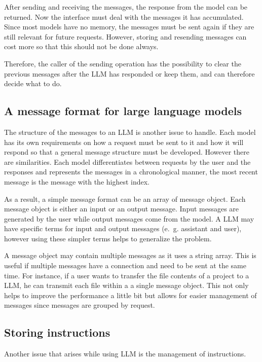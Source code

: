After sending and receiving the messages, the response from the model can be returned. Now the interface must deal with the messages it has accumulated. Since most models have no memory, the messages must be sent again if they are still relevant for future requests. However, storing and resending messages can cost more so that this should not be done always.

Therefore, the caller of the sending operation has the possibility to clear the previous messages after the \ac{LLM} has responded or keep them, and can therefore decide what to do.

\subsection{A message format for large language models} \label{sec:llm_msg_structure}
The structure of the messages to an \ac{LLM} is another issue to handle. Each model has its own requirements on how a request must be sent to it and how it will respond so that a general message structure must be developed. However there are similarities. Each model differentiates between requests by the user and the responses and represents the messages in a chronological manner, the most recent message is the message with the highest index. 

As a result, a simple message format can be an array of message object. Each message object is either an input or an output message. Input messages are generated by the user while output messages come from the model. A \ac{LLM} may have specific terms for input and output messages (e.~g. assistant and user), however using these simpler terms helps to generalize the problem.

A message object may contain multiple messages as it uses a string array. This is useful if multiple messages have a connection and need to be sent at the same time. For instance, if a user wants to transfer the file contents of a project to a \ac{LLM}, he can transmit each file within a a single message object. This not only helps to improve the performance a little bit but allows for easier management of messages since messages are grouped by request. 

\subsection{Storing instructions}\label{llm_msg_storage}

Another issue that arises while using \ac{LLM} is the management of instructions.

